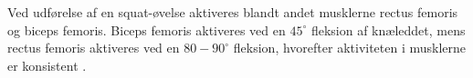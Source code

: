 Ved udførelse af en squat-øvelse aktiveres blandt andet musklerne rectus femoris og biceps femoris. Biceps femoris aktiveres ved en $45^{\circ}$ fleksion af knæleddet, mens rectus femoris aktiveres ved en $80-90^{\circ}$ fleksion, hvorefter aktiviteten i musklerne er konsistent \citep{schoenfeld2010}. 



